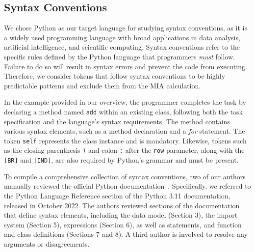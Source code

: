 

\subsection{Syntax Conventions}

We chose Python as our target language for studying syntax conventions, as it is a widely used programming language with broad applications in data analysis, artificial intelligence, and scientific computing. Syntax conventions refer to the specific rules defined by the Python language that programmers \textit{must} follow. Failure to do so will result in syntax errors and prevent the code from executing. Therefore, we consider tokens that follow syntax conventions to be highly predictable patterns and exclude them from the MIA calculation.

In the example provided in our overview, the programmer completes the task by declaring a method named \texttt{add} within an existing class, following both the task specification and the language's syntax requirements. The method contains various syntax elements, such as a method declaration and a \textit{for} statement. The token \texttt{self} represents the class instance and is mandatory. Likewise, tokens such as the closing parenthesis \texttt{)} and colon \texttt{:} after the \texttt{row} parameter, along with the \texttt{[BR]} and \texttt{[IND]}, are also required by Python's grammar and must be present.

To compile a comprehensive collection of syntax conventions, two of our authors %
manually reviewed the official Python documentation~\cite{python11}. Specifically, we referred to the Python Language Reference section of the Python 3.11 documentation, released in October 2022. The authors reviewed sections of the documentation that define syntax elements, including the data model (Section 3), the import system (Section 5), expressions (Section 6), as well as statements, and function and class definitions (Sections 7 and 8). A third author is involved to resolve any arguments or disagreements.

